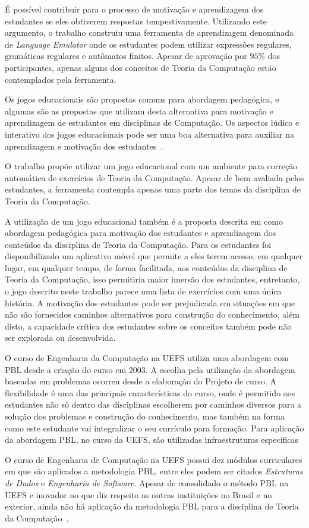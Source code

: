 É possível contribuir para o processo de
motivação e aprendizagem dos estudantes se
eles obtiverem respostas
tempestivamente.
Utilizando este argumento, o
trabalho \cite{vieira2003language} construiu
uma ferramenta de aprendizagem denominada
de \textit{Language Emulator} onde os estudantes
podem utilizar expressões regulares, gramáticas
regulares e autômatos finitos.
Apesar de aprovação por $95\%$ dos
participantes, apenas alguns dos conceitos de Teoria
da Computação estão contemplados pela ferramenta.

Os jogos educacionais são propostas comuns para abordagem
pedagógica, e algumas são as propostas que utilizam
desta alternativa para motivação e aprendizagem
de estudantes em disciplinas de Computação.
Os aspectos lúdico e interativo dos jogos educacionais
pode ser uma boa alternativa para auxiliar na aprendizagem
e motivação dos estudantes~\cite{silva2010automata}.

O trabalho \cite{leite2014montanha} propõe utilizar
um jogo educacional com um ambiente para correção
automática de exercícios de Teoria da Computação.
Apesar de bem avaliada pelos estudantes, a ferramenta
contempla apenas uma parte dos temas da disciplina
de Teoria da Computação.

A utilização de um jogo educacional também é a
proposta descrita em \cite{de2011jogo}
como abordagem pedagógica para motivação dos estudantes
e aprendizagem dos conteúdos da disciplina de Teoria da
Computação.
Para os estudantes foi disponibilizado um aplicativo
móvel que permite a eles terem acesso, em qualquer lugar,
em qualquer tempo, de forma facilitada, aos conteúdos
da disciplina de Teoria da Computação, isso permitiria
maior imersão dos estudantes, entretanto, o jogo
descrito neste trabalho parece uma lista de
exercícios com uma única história.
A motivação dos estudantes pode ser prejudicada
em situações em que não são fornecidos caminhos
alternativos para construção do conhecimento,
além disto, a capacidade crítica dos estudantes
sobre os conceitos também pode não ser explorada
ou desenvolvida.

O curso de Engenharia da Computação na
\ac{UEFS} utiliza uma abordagem com PBL desde a criação
do curso em 2003.
A escolha pela utilização da abordagem baseadas em
problemas ocorreu desde a elaboração do Projeto de curso.
A flexibilidade é uma das principais características do
curso, onde é permitido aos estudantes não só dentro
das disciplinas escolherem por caminhos diversos
para a solução dos problemas e construção do conhecimento,
mas também na forma como este estudante vai integralizar
o seu currículo para formação.
Para aplicação da abordagem \ac{PBL}, no curso da \ac{UEFS},
são utilizadas infraestruturas
específicas~\cite{dos2007aplicaccao, bittencourt2003curriculo}

O curso de Engenharia de Computação na \ac{UEFS}
possui dez módulos curriculares em que são
aplicados a metodologia PBL, entre eles podem ser citados
\textit{Estruturas de Dados} e
\textit{Engenharia de Software}.
Apesar de consolidado o método PBL na \ac{UEFS}
e inovador no que diz respeito as outras
instituições no Brasil e no exterior,
ainda não há aplicação da metodologia PBL para
a disciplina de Teoria da Computação~\cite{dospensamento}.
